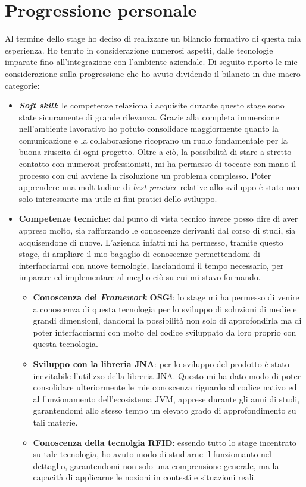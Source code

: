 \section{Progressione personale}
\label{sec:prog-personale}
Al termine dello stage ho deciso di realizzare un bilancio formativo di questa mia esperienza.
Ho tenuto in considerazione numerosi aspetti, dalle tecnologie imparate fino all'integrazione con l'ambiente aziendale.
Di seguito riporto le mie considerazione sulla progressione che ho avuto dividendo il bilancio in due
macro categorie: 
\begin{itemize}
    \item \textbf{\emph{Soft skill}}: le competenze relazionali acquisite durante questo stage sono state sicuramente di grande rilevanza. Grazie alla completa immersione
    nell'ambiente lavorativo ho potuto consolidare maggiormente quanto la comunicazione e la collaborazione ricoprano un ruolo fondamentale per la buona riuscita di ogni progetto.
    Oltre a ciò, la possibilità di stare a stretto contatto con numerosi professionisti, mi ha permesso di toccare con mano il processo con cui avviene la risoluzione un problema complesso.
    Poter apprendere una moltitudine di \emph{best practice} relative allo sviluppo è stato non solo interessante ma utile ai fini pratici dello sviluppo.
    \item \textbf{Competenze tecniche}: dal punto di vista tecnico invece posso dire di aver appreso molto, sia rafforzando le conoscenze derivanti dal corso di studi, 
    sia acquisendone di nuove.
    L’azienda infatti mi ha permesso, tramite questo stage, di ampliare il mio bagaglio di conoscenze permettendomi di interfacciarmi con nuove tecnologie, 
    lasciandomi il tempo necessario, per imparare ed implementare al meglio ciò su cui mi stavo formando.
    \begin{itemize}
        \item \textbf{Conoscenza dei \emph{Framework} OSGi}: lo stage mi ha permesso di venire a conoscenza di questa tecnologia per lo sviluppo di soluzioni di medie e grandi dimensioni,
        dandomi la possibilità non solo di approfondirla ma di poter interfacciarmi con molto del codice sviluppato da loro proprio con questa tecnologia.
        \item \textbf{Sviluppo con la libreria JNA}: per lo sviluppo del prodotto è stato inevitabile l'utilizzo della libreria JNA. Questo mi ha dato modo di poter consolidare
        ulteriormente le mie conoscenza riguardo al codice nativo ed al funzionamento dell'ecosistema JVM, apprese durante gli anni di studi, garantendomi allo stesso tempo
        un elevato grado di approfondimento su tali materie.
        \item \textbf{Conoscenza della tecnolgia RFID}: essendo tutto lo stage incentrato su tale tecnologia, ho avuto modo di studiarne il funziomanto nel dettaglio, garantendomi non solo
        una comprensione generale, ma la capacità di applicarne le nozioni in contesti e situazioni reali.
    \end{itemize}
\end{itemize}

